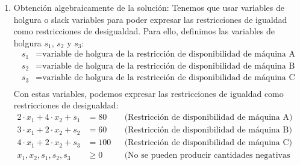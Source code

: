 \documentclass[../main.tex]{subfiles}
\begin{document}
\begin{exercise}
\begin{enumerate}
                \item Obtención algebraicamente de la solución:
                    Tenemos que usar variables de holgura o slack variables para poder expresar las restricciones de igualdad como restricciones de desigualdad. Para ello, definimos las variables de holgura $s_1$, $s_2$ y $s_3$:
                    \begin{equation}
                        \begin{split}
                            s_1 &= \text{variable de holgura de la restricción de disponibilidad de máquina A} \\
                            s_2 &= \text{variable de holgura de la restricción de disponibilidad de máquina B} \\
                            s_3 &= \text{variable de holgura de la restricción de disponibilidad de máquina C} \\
                        \end{split}
                    \end{equation}
                    Con estas variables, podemos expresar las restricciones de igualdad como restricciones de desigualdad:
                    \begin{equation}
                        \begin{aligned}
                            2 \cdot x_1 + 4 \cdot x_2 + s_1 &= 80 && \text{(Restricción de disponibilidad de máquina A)} \\
                            3 \cdot x_1 + 2 \cdot x_2 + s_2 &= 60 && \text{(Restricción de disponibilidad de máquina B)}\\
                            4 \cdot x_1 + 2 \cdot x_2 + s_3 &= 100 && \text{(Restricción de disponibilidad de máquina C)}\\
                            x_1, x_2, s_1, s_2, s_3 & \geq 0 && \text{(No se pueden producir cantidades negativas de productos)}\\
                        \end{aligned}
                    \end{equation}



                    
            \end{enumerate}

        \end{exercise}
\end{document}
